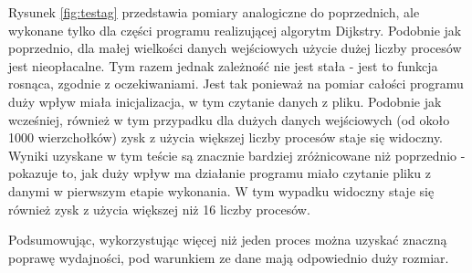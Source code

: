 \documentclass[12pt]{article}
\begin{document}
\vspace{5mm}
Rysunek \ref{fig:testag} przedstawia pomiary analogiczne do poprzednich, ale wykonane tylko dla części programu realizującej algorytm Dijkstry. Podobnie jak poprzednio, dla małej wielkości danych wejściowych użycie dużej liczby procesów jest nieopłacalne. Tym razem jednak zależność nie jest stała - jest to funkcja rosnąca, zgodnie z oczekiwaniami. Jest tak ponieważ na pomiar całości programu duży wpływ miała inicjalizacja, w tym czytanie danych z pliku. Podobnie jak wcześniej, również w tym przypadku dla dużych danych wejściowych (od około 1000 wierzchołków) zysk z użycia większej liczby procesów staje się widoczny. Wyniki uzyskane w tym teście są znacznie bardziej zróżnicowane niż poprzednio - pokazuje to, jak duży wpływ ma działanie programu miało czytanie pliku z danymi w pierwszym etapie wykonania. W tym wypadku widoczny staje się również zysk z użycia większej niż 16 liczby procesów.

\vspace{5mm}
Podsumowując, wykorzystując więcej niż jeden proces można uzyskać znaczną poprawę wydajności, pod warunkiem ze dane mają odpowiednio duży rozmiar.
\end{document}
